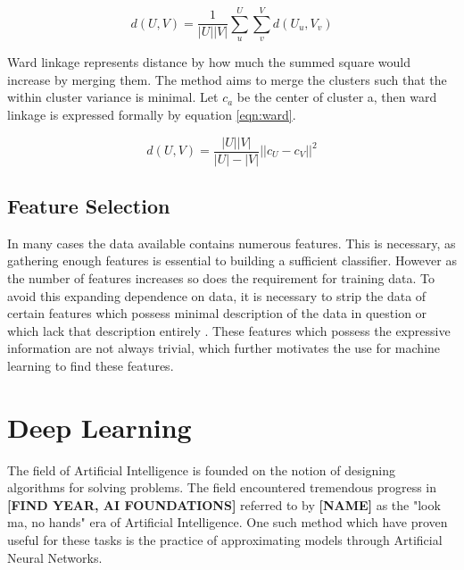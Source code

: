 \begin{equation}
\label{eqn:average}
d(U, V) = \frac{1}{|U||V|}\sum\limits_u^U \sum\limits_v^V  d(U_u, V_v)
\end{equation}

Ward linkage represents distance by how much the summed square would increase by merging them. The method aims to merge the clusters such that the within cluster variance is minimal. Let $c_a$ be the center of cluster a, then ward linkage is expressed formally by equation \ref{eqn:ward}\cite{shalizi2009distances}.


\begin{equation}
\label{eqn:ward}
d(U, V) = \frac{|U||V|}{|U|-|V|}||c_U - c_V||^2
\end{equation}



\subsection{Feature Selection}

In many cases the data available contains numerous features. This is necessary, as gathering enough features is essential to building a sufficient classifier. However as the number of features increases so does the requirement for training data. To avoid this expanding dependence on data, it is necessary to strip the data of certain features which possess minimal description of the data in question or which lack that description entirely \cite{dash1997feature}. These features which possess the expressive information are not always trivial, which further motivates the use for machine learning to find these features.

\section{Deep Learning}

The field of Artificial Intelligence is founded on the notion of designing algorithms for solving problems. The field encountered tremendous progress in \textbf{[FIND YEAR, AI FOUNDATIONS]} referred to by \textbf{[NAME]} as the "look ma, no hands" era of Artificial Intelligence. One such method which have proven useful for these tasks is the practice of approximating models through Artificial Neural Networks.

